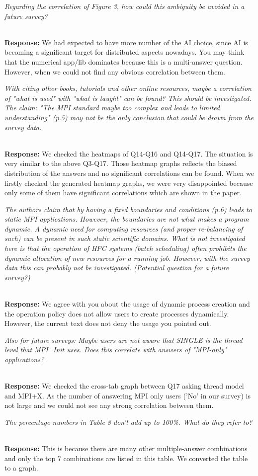 \documentclass[11pt]{article}
\newcommand{\iresponse}[2]{{\item \em #1}\\%
  {\bf Response:} #2}
\begin{document}
\begin{enumerate}
\iresponse{Regarding the correlation of Figure 3, how could this
  ambiguity be avoided in a future survey?}
{We had expected to have more number of the AI choice, since AI is
  becoming a significant target for distributed aspects nowadays. You may think that the numerical
  app/lib dominates because this is a multi-answer question. However,
  when we could not find any obvious correlation between them.}

\iresponse{With citing other books, tutorials and other online
  resources, maybe a correlation of "what is used" with "what is
  taught" can be found? This should be investigated. The claim: "The
  MPI standard maybe too complex and leads to limited understanding"
  (p.5) may not be the only conclusion that could be drawn from the
  survey data.}
{We checked the heatmaps of Q14-Q16 and Q14-Q17. The situation is very
  similar to the above Q3-Q17. Those heatmap graphs reflects the
  biased distribution of the answers and no significant correlations
  can be found. When we firstly checked the generated heatmap graphs, we
  were very disappointed because only some of them have significant
  correlations which are shown in the paper.}

\iresponse{The authors claim that by having a fixed boundaries and
  conditions (p.6) leads to static MPI applications. However, the
  boundaries are not what makes a program dynamic. A dynamic need for
  computing resources (and proper re-balancing of such) can be present
  in such static scientific domains. What is not investigated here is
  that the operation of HPC systems (batch scheduling) often prohibits
  the dynamic allocation of new resources for a running job. However,
  with the survey data this can probably not be
  investigated. (Potential question for a future survey?)}
{We agree with you about the usage of dynamic process creation and the
  operation policy does not allow users to create processes dynamically.
  However, the current text does not deny the usage you pointed
  out.}

\iresponse{Also for future surveys: Maybe users are not aware that
  SINGLE is the thread level that MPI\_Init uses. Does this correlate
  with answers of "MPI-only" applications?}
{We checked the cross-tab graph between Q17 asking thread model and
  MPI+X. As the number of answering MPI only users ('No' in our
  survey) is not large and we could not see any strong correlation
  between them. }

\iresponse{The percentage numbers in Table 8 don't add up to
  100\%. What do they refer to?}
{This is because there are many other multiple-answer combinations and
only the top 7 combinations are listed in this table. We converted the
table to a graph.}


\end{enumerate}
\end{document}
